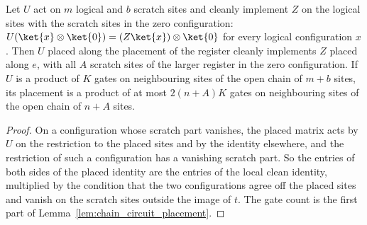 \begin{lemma}
    \label{lem:clean_circuit_placement}
    \leanok
    Let $U$ act on $m$ logical and $b$ scratch sites and cleanly implement $Z$
    on the logical sites with the scratch sites in the zero configuration:
    $U(\ket{x}\otimes\ket{0})=(Z\ket{x})\otimes\ket{0}$ for every logical
    configuration $x$. Then $U$ placed along the placement of the register
    cleanly implements $Z$ placed along $e$, with all $A$ scratch sites of the
    larger register in the zero configuration. If $U$ is a product of $K$ gates
    on neighbouring sites of the open chain of $m+b$ sites, its placement is a
    product of at most $2(n+A)K$ gates on neighbouring sites of the open chain of
    $n+A$ sites.
\end{lemma}

\begin{proof}\leanok
    On a configuration whose scratch part vanishes, the placed matrix acts by
    $U$ on the restriction to the placed sites and by the identity elsewhere,
    and the restriction of such a configuration has a vanishing scratch part. So
    the entries of both sides of the placed identity are the entries of the
    local clean identity, multiplied by the condition that the two
    configurations agree off the placed sites and vanish on the scratch sites
    outside the image of $t$. The gate count is the first part of
    Lemma~\ref{lem:chain_circuit_placement}.
\end{proof}
